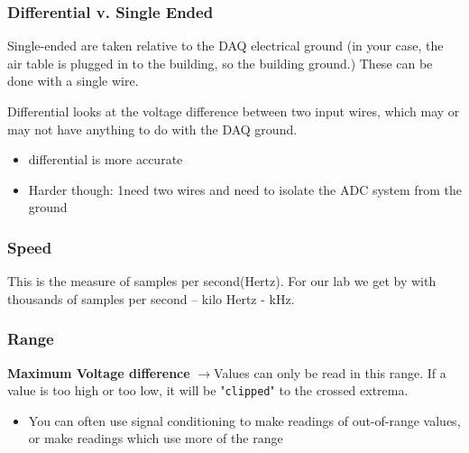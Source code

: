 \documentclass[a4paper,12pt]{article}
\newcommand{\ra}{$\rightarrow$}
\begin{document}
          \subsubsection*{Differential v. Single Ended}
          Single-ended are taken relative to the DAQ electrical ground (in your case, the air table is plugged in to the building, so the building ground.) These can be done with a single wire.\vspace{8pt}
          \par Differential looks at the voltage difference between two input wires, which may or may not have anything to do with the DAQ ground.
          \begin{itemize}
            \item differential is more accurate
            \item Harder though: 1need two wires and need to isolate the ADC system from the ground
          \end{itemize}
          \subsubsection*{Speed}
             This is the measure of samples per second(Hertz). For our lab we get by with thousands of samples per second – kilo Hertz - kHz.
          \subsubsection*{Range}
            \textbf{Maximum Voltage difference} \ra Values can only be read in this range. If a value is too high or too low, it will be "\texttt{clipped}" to the crossed extrema.
            \begin{itemize}
              \item  You can often use signal conditioning to make readings of out-of-range values, or make readings which use more of the range
            \end{itemize}
\end{document}
